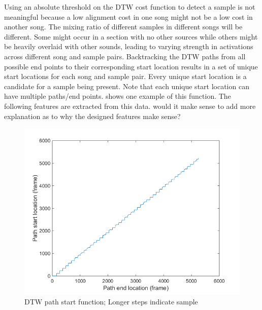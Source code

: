 \documentclass{article}
\begin{document}
Using an absolute threshold on the DTW cost function to detect a sample is not meaningful because a low alignment cost in one song might not be a low cost in another song. The mixing ratio of different samples in different songs will be different. Some might occur in a section with no other sources while others might be heavily overlaid with other sounds, leading to varying strength in activations across different song and sample pairs. Backtracking the DTW paths from all possible end points to their corresponding start location results in a set of unique start locations for each song and sample pair. Every unique start location is a candidate for a sample being present. Note that each unique start location can have multiple paths/end points.  shows one example of this function.
The following features are extracted from this data. {\color{red}would it make sense to add more explanation as to why the designed features make sense?}


\begin{figure}[t]
\centering
\includegraphics[width=\linewidth]{DTWpath.png}
\caption{DTW path start function; Longer steps indicate sample}
\label{fig4}
\end{figure}
\end{document}
